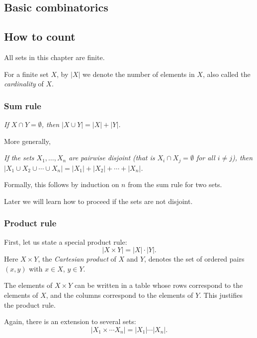 


\begin{page}

\chapter{Basic combinatorics}

\section{How to count}
All sets in this chapter are finite.

For a finite set $X$, by $|X|$ we denote the number of elements in $X$, also called the \emph{cardinality} of $X$.

\subsection{Sum rule}
\begin{center}
\emph{If $X \cap Y = \emptyset$, then $|X \cup Y| = |X| + |Y|$.}
\end{center}

More generally,
\begin{center}
\parbox{.9\textwidth}{\emph{If the sets $X_1, \ldots, X_n$ are pairwise disjoint
(that is $X_i \cap X_j = \emptyset$ for all $i \ne j$),
then $|X_1 \cup X_2 \cup \cdots \cup X_n| = |X_1| + |X_2| + \cdots + |X_n|$.}}
\end{center}
Formally, this follows by induction on $n$ from the sum rule for two sets.

Later we will learn how to proceed if the sets are not disjoint.

\subsection{Product rule}
First, let us state a special product rule:
\[
|X \times Y| = |X| \cdot |Y|.
\]
Here $X \times Y$, the \emph{Cartesian product} of $X$ and $Y$, denotes the set of ordered pairs $(x,y)$ with $x \in X$, $y \in Y$.

The elements of $X \times Y$ can be written in a table whose rows correspond to the elements of $X$,
and the columns correspond to the elements of $Y$.
This justifies the product rule.

Again, there is an extension to several sets:
\[
|X_1 \times \cdots X_n| = |X_1| \cdots |X_n|.
\]


\end{page}

